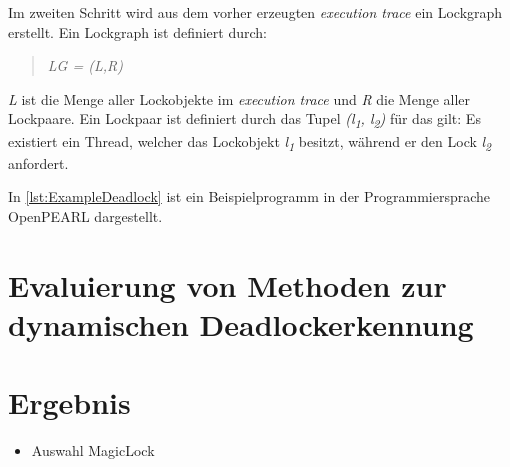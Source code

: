 Im zweiten Schritt wird aus dem vorher erzeugten \textit{execution trace} ein
Lockgraph erstellt. Ein Lockgraph ist definiert durch:
\begin{quote}
\textit{LG = (L,R)}
\end{quote}
\textit{L} ist die Menge aller Lockobjekte im \textit{execution trace} und
\textit{R} die Menge aller Lockpaare. Ein Lockpaar ist definiert durch das Tupel
\textit{(l\textsubscript{1}, l\textsubscript{2})} für das gilt: Es existiert ein
Thread, welcher das Lockobjekt \textit{l\textsubscript{1}} besitzt, während er
den Lock \textit{l\textsubscript{2}} anfordert.



In \cref{lst:ExampleDeadlock} ist ein Beispielprogramm in der Programmiersprache
OpenPEARL dargestellt.

\section{Evaluierung von Methoden zur dynamischen Deadlockerkennung}
\label{section:Evaluierung von Methoden zur dynamischen Deadlockerkennung}

\section{Ergebnis}
\label{section:Ergebnis}
\begin{itemize}
  \item Auswahl MagicLock\autocite{MagicLock}
\end{itemize}